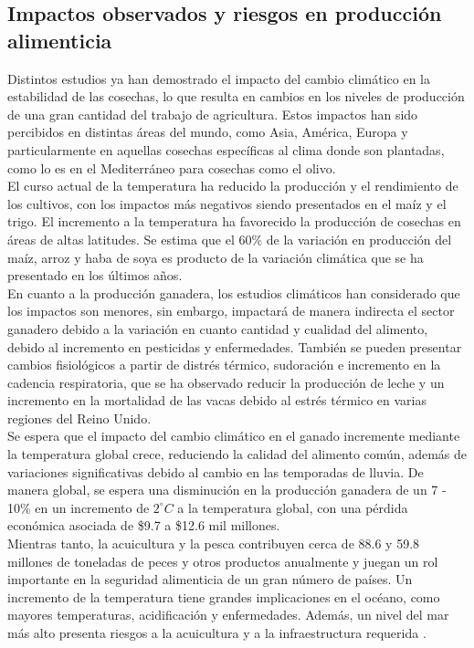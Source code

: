 \documentclass{article}
\begin{document}
\subsection{Impactos observados y riesgos en producción alimenticia}
Distintos estudios ya han demostrado el impacto del cambio climático en la estabilidad de las cosechas, lo que resulta en cambios en los niveles de producción de una gran cantidad del trabajo de agricultura. Estos impactos han sido percibidos en distintas áreas del mundo, como Asia, América, Europa y particularmente en aquellas cosechas específicas al clima donde son plantadas, como lo es en el Mediterráneo para cosechas como el olivo.
\\
El curso actual de la temperatura ha reducido la producción y el rendimiento de los cultivos, con los impactos más negativos siendo presentados en el maíz y el trigo. El incremento a la temperatura ha favorecido la producción de cosechas en áreas de altas latitudes. Se estima que el 60\% de la variación en producción del maíz, arroz y haba de soya es producto de la variación climática que se ha presentado en los últimos años.
\\
En cuanto a la producción ganadera, los estudios climáticos han considerado que los impactos son menores, sin embargo, impactará de manera indirecta el sector ganadero debido a la variación en cuanto cantidad y cualidad del alimento, debido al incremento en pesticidas y enfermedades. También se pueden presentar cambios fisiológicos a partir de distrés térmico, sudoración e incremento en la cadencia respiratoria, que se ha observado reducir la producción de leche y un incremento en la mortalidad de las vacas debido al estrés térmico en varias regiones del Reino Unido.
\\
Se espera que el impacto del cambio climático en el ganado incremente mediante la temperatura global crece, reduciendo la calidad del alimento común, además de variaciones significativas debido al cambio en las temporadas de lluvia. De manera global, se espera una disminución en la producción ganadera de un 7 - 10\% en un incremento de $2^{\circ}C$ a la temperatura global, con una pérdida económica asociada de \$9.7 a \$12.6 mil millones.
\\
Mientras tanto, la acuicultura y la pesca contribuyen cerca de 88.6 y 59.8 millones de toneladas de peces y otros productos anualmente y juegan un rol importante en la seguridad alimenticia de un gran número de países. Un incremento de la temperatura tiene grandes implicaciones en el océano, como mayores temperaturas, acidificación y enfermedades. Además, un nivel del mar más alto presenta riesgos a la acuicultura y a la infraestructura requerida \cite{Hoegh}.
\end{document}
